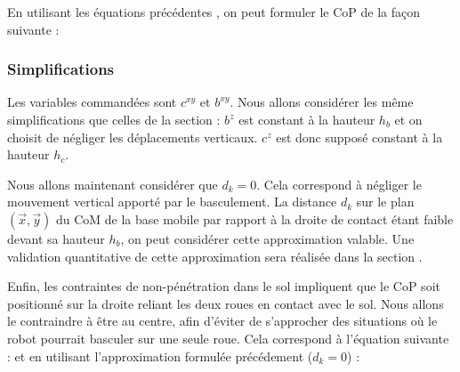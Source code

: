 				En utilisant les équations précédentes , on peut formuler le CoP de la façon suivante :	
				
			\subsubsection{Simplifications}
				
				Les variables commandées sont $c^{xy}$ et $b^{xy}$. Nous allons considérer les même simplifications que celles de la section  :
				$b^z$ est constant à la hauteur $h_b$ et on choisit de négliger les déplacements verticaux. $c^z$ est donc supposé constant à la hauteur $h_c$.
				
				Nous allons maintenant considérer que $d_k=0$. Cela correspond à négliger le mouvement vertical apporté par le basculement. 
				La distance $d_k$ sur le plan $(\vec{x},\vec{y})$ du CoM de la base mobile par rapport à la droite de contact étant faible devant sa hauteur $h_b$, on peut considérer cette approximation valable. 
				Une validation quantitative de cette approximation sera réalisée dans la section .
				
				Enfin, les contraintes de non-pénétration dans le sol impliquent que le CoP soit positionné sur la droite reliant les deux roues en contact avec le sol.
				Nous allons le contraindre à être au centre, afin d'éviter de s'approcher des situations où le robot pourrait basculer sur une seule roue.
				Cela correspond à l'équation suivante :
				et en utilisant l'approximation formulée précédement ($d_k=0$) :
				
